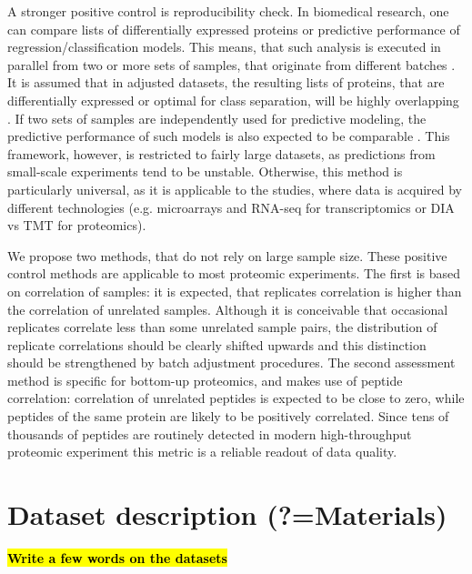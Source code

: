 \documentclass[num-refs]{wiley-article}
\begin{document}
A stronger positive control is reproducibility check. In biomedical research, one can compare lists of differentially expressed proteins or predictive performance of regression/classification models. This means, that such analysis is executed in parallel from two or more sets of samples, that originate from different batches \cite{Lazar:2013aa}. It is assumed that in adjusted datasets, the resulting lists of proteins, that are differentially expressed or optimal for class separation, will be highly overlapping \cite{Shabalin:2008aa}. If two sets of samples are independently used for predictive modeling, the predictive performance of such models is also expected to be comparable \cite{Luo2010}. This framework, however, is restricted to fairly large datasets, as predictions from small-scale experiments tend to be unstable. Otherwise, this method is particularly universal, as it is applicable to the studies, where data is acquired by different technologies (e.g. microarrays and RNA-seq for transcriptomics or DIA vs TMT for proteomics).
 
We propose two methods, that do not rely on large sample size. These positive control methods are applicable to most proteomic experiments. The first is based on correlation of samples: it is expected, that replicates correlation is higher than the correlation of unrelated samples. Although it is conceivable that occasional replicates correlate less than some unrelated sample pairs, the distribution of replicate correlations should be clearly shifted upwards and this distinction should be strengthened by batch adjustment procedures. The second assessment method is specific for bottom-up proteomics, and makes use of peptide correlation: correlation of unrelated peptides is expected to be close to zero, while peptides of the same protein are likely to be positively correlated. Since tens of thousands of peptides are routinely detected in modern high-throughput proteomic experiment this metric is a reliable readout of data quality.

\section{Dataset description (?=Materials)}\label{subsec:datasets}

\textcolor{red}{\textbf{\hl{Write a few words on the datasets}}}
\end{document}
